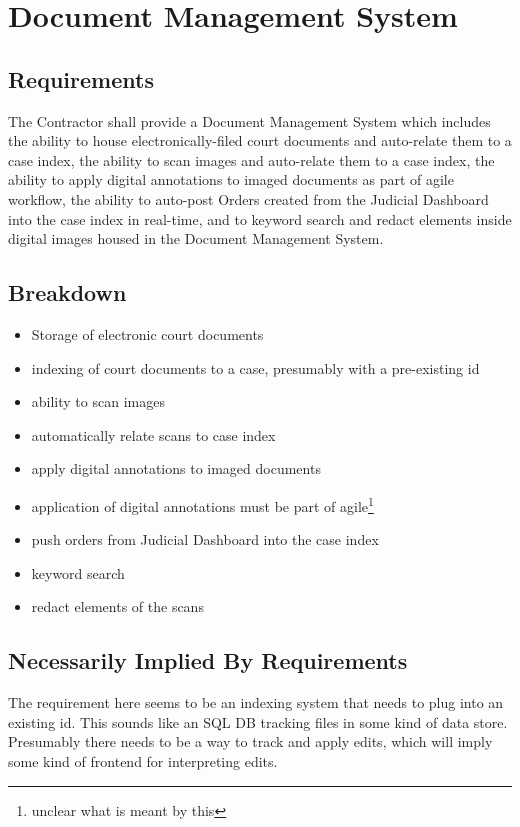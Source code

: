\section{Document Management System}

\subsection{Requirements}
The Contractor shall provide a Document Management System which includes the
ability to house electronically-filed court documents and auto-relate them to a
case index, the ability to scan images and auto-relate them to a case index,
the ability to apply digital annotations to imaged documents as part of agile
workflow, the ability to auto-post Orders created from the Judicial Dashboard
into the case index in real-time, and to keyword search and redact elements
inside digital images housed in the Document Management System.

\subsection{Breakdown}
\begin{itemize}
	\item Storage of electronic court documents
	\item indexing of court documents to a case, presumably with a
	pre-existing id
	\item ability to scan images
	\item automatically relate scans to case index
	\item apply digital annotations to imaged documents
	\item application of digital annotations must be part of
	agile\footnote{unclear what is meant by this}
	\item push orders from Judicial Dashboard into the case index
	\item keyword search
	\item redact elements of the scans
\end{itemize}

\subsection{Necessarily Implied By Requirements}
The requirement here seems to be an indexing system that needs to plug into an
existing id.  This sounds like an SQL DB tracking files in some kind of data
store.  Presumably there needs to be a way to track and apply edits, which will
imply some kind of frontend for interpreting edits.

